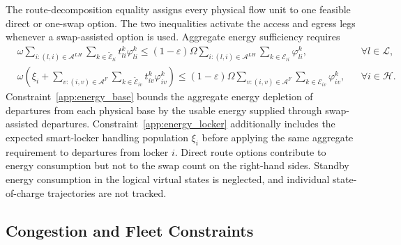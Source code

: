 \documentclass[final,3p,authoryear]{elsarticle}
\begin{document}
The route-decomposition equality assigns every physical flow unit to one feasible direct or one-swap option.
The two inequalities activate the access and egress legs whenever a swap-assisted option is used.
Aggregate energy sufficiency requires
\begin{align}
&
\omega
\sum_{i:(l,i)\in\mathcal A^{LH}}
\sum_{k\in\widetilde{\mathcal E}_{li}}
t_{li}^{k}\varphi_{li}^{k}
\le
(1-\varepsilon)\Omega
\sum_{i:(l,i)\in\mathcal A^{LH}}
\sum_{k\in\mathcal E_{li}}
\varphi_{li}^{k},
&&\forall l\in\mathcal L,
\label{app:energy_base}
\\
&
\omega
\left(
\xi_i+
\sum_{v:(i,v)\in\mathcal A^{F}}
\sum_{k\in\widetilde{\mathcal E}_{iv}}
t_{iv}^{k}\varphi_{iv}^{k}
\right)
\le
(1-\varepsilon)\Omega
\sum_{v:(i,v)\in\mathcal A^{F}}
\sum_{k\in\mathcal E_{iv}}
\varphi_{iv}^{k},
&&\forall i\in\mathcal H.
\label{app:energy_locker}
\end{align}
Constraint~\eqref{app:energy_base} bounds the aggregate energy depletion of departures from each physical base by the usable energy supplied through swap-assisted departures.
Constraint~\eqref{app:energy_locker} additionally includes the expected smart-locker handling population $\xi_i$ before applying the same aggregate requirement to departures from locker $i$.
Direct route options contribute to energy consumption but not to the swap count on the right-hand sides.
Standby energy consumption in the logical virtual states is neglected, and individual state-of-charge trajectories are not tracked.

\subsection{Congestion and Fleet Constraints}
\end{document}
